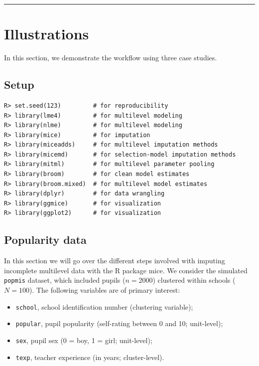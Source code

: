 \documentclass[
  article]{jss}
\providecommand{\tightlist}{%
  \setlength{\itemsep}{0pt}\setlength{\parskip}{0pt}}\usepackage{longtable,booktabs,array}
\begin{document}
\begin{center}\rule{0.5\linewidth}{0.5pt}\end{center}

\hypertarget{sec-illustrations}{%
\section{Illustrations}\label{sec-illustrations}}

In this section, we demonstrate the workflow using three case studies.

\hypertarget{setup}{%
\subsection{Setup}\label{setup}}

\begin{verbatim}
R> set.seed(123)         # for reproducibility
R> library(lme4)         # for multilevel modeling
R> library(nlme)         # for multilevel modeling
R> library(mice)         # for imputation
R> library(miceadds)     # for multilevel imputation methods
R> library(micemd)       # for selection-model imputation methods
R> library(mitml)        # for multilevel parameter pooling
R> library(broom)        # for clean model estimates
R> library(broom.mixed)  # for multilevel model estimates
R> library(dplyr)        # for data wrangling
R> library(ggmice)       # for visualization
R> library(ggplot2)      # for visualization
\end{verbatim}

\hypertarget{popularity-data}{%
\subsection{Popularity data}\label{popularity-data}}

In this section we will go over the different steps involved with
imputing incomplete multilevel data with the R package mice. We consider
the simulated \texttt{popmis} dataset, which included pupils
(\(n = 2000\)) clustered within schools (\(N = 100\)). The following
variables are of primary interest:

\begin{itemize}
\tightlist
\item
  \texttt{school}, school identification number (clustering variable);
\item
  \texttt{popular}, pupil popularity (self-rating between 0 and 10;
  unit-level);
\item
  \texttt{sex}, pupil sex (0 = boy, 1 = girl; unit-level);
\item
  \texttt{texp}, teacher experience (in years; cluster-level).
\end{itemize}
\end{document}
